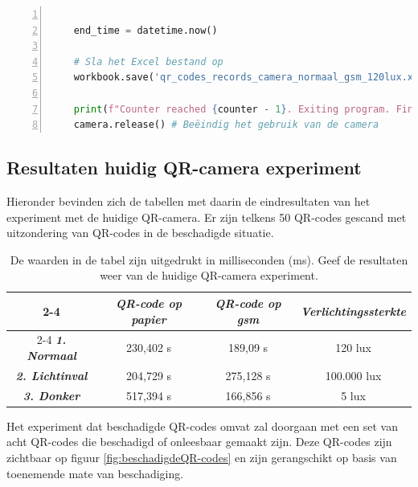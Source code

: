 \begin{lstlisting}[language=Python, caption={Python script voor experiment van QR-code camera \autocite{LockitRentals}.}, label=lst:huidigeQR-codeData, numbers=left]
    
    end_time = datetime.now()
    
    # Sla het Excel bestand op
    workbook.save('qr_codes_records_camera_normaal_gsm_120lux.xlsx')
    
    print(f"Counter reached {counter - 1}. Exiting program. Final time of scanning: {end_time - start_time}")
    camera.release() # Beëindig het gebruik van de camera    
\end{lstlisting}

\subsection{Resultaten huidig QR-camera experiment}
\label{sec:huidigeToepassingScannersExperiment}

Hieronder bevinden zich de tabellen met daarin de eindresultaten van het experiment met de huidige QR-camera. Er zijn telkens 50 QR-codes gescand met uitzondering van QR-codes in de beschadigde situatie.

\begin{table}[h]
    \centering
    \begin{tabular}{ c|c|c|c }
        \cline{2-4}
        & \textbf{\textit{QR-code op papier}} & \textbf{\textit{QR-code op gsm}} & \textbf{\textit{Verlichtingssterkte}} \\
        \cline{2-4}        
        \hline
        \textbf{\textit{1. Normaal}} &  230,402 s & 189,09 s & 120 lux \\
        \hline
        \textbf{\textit{2. Lichtinval}} & 204,729 s & 275,128 s & 100.000 lux \\
        \hline
        \textbf{\textit{3. Donker}} & 517,394 s & 166,856 s & 5 lux \\
        \hline        
    \end{tabular}
    \captionsetup{justification=centering}
    \caption{De waarden in de tabel zijn uitgedrukt in milliseconden (ms). Geef de resultaten weer van de huidige QR-camera experiment.}
    \label{tab:3expeQR-camera}
\end{table}

Het experiment dat beschadigde QR-codes omvat zal doorgaan met een set van acht QR-codes die beschadigd of onleesbaar gemaakt zijn. Deze QR-codes zijn zichtbaar op figuur \ref{fig:beschadigdeQR-codes} en zijn gerangschikt op basis van toenemende mate van beschadiging.

